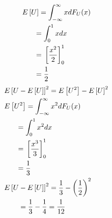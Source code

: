 \documentclass[journal,12pt,twocolumn]{IEEEtran}
\begin{document}
    \begin{align}
        &E{}\left[U\right] = \int_{-\infty}^{\infty}x dF_U(x)\\
        &~~~~~= \int_{0}^{1}x dx\\
        &~~~~~= {}\left[\frac{x^2}{2}\right]^1_0\\
        &~~~~~= \frac{1}{2}
    \end{align}
    \begin{align}
        &E{}\left[U-E{}\left[U\right]\right]^2 = E{}\left[U^2\right] - E{}\left[U\right]^2\\
        &E{}\left[U^2\right] = \int_{-\infty}^{\infty}x^2 dF_U(x)\\
        &~~~~~= \int_{0}^{1}x^2 dx\\
        &~~~~~= {}\left[\frac{x^3}{3}\right]^1_0\\
        &~~~~~= \frac{1}{3}\\
        &E{}\left[U-E{}\left[U\right]\right]^2 =  \frac{1}{3} - \left(\frac{1}{2}\right)^2\\
        &~~~~~~ = \frac{1}{3} - \frac{1}{4}  =\frac{1}{12}
    \end{align}
\end{document}
